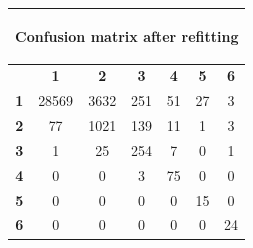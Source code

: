 \documentclass[c]{beamer}
\begin{document}
\begin{frame}
\begin{columns}
\begin{column}{0.6\textwidth}
  \begin{table}
  \begin{center}
  \begin{adjustbox}{max width=0.6\textwidth}
  {\tiny
  \begin{tabular}{|c|c|c|c|c|c|c|}
    \hline
    \multicolumn{7}{|c|}{{\tiny \begin{bf}Confusion matrix after refitting\end{bf}}} \\
    \hline
     & \textbf{1} & \textbf{2} & \textbf{3} & \textbf{4} & \textbf{5} & \textbf{6}\\
    \hline
    \textbf{1} & 28569 & 3632 & 251 & 51 & 27 & 3\\
    \hline
    \textbf{2} & 77 & 1021 & 139 & 11 & 1 & 3\\
    \hline
    \textbf{3} & 1 & 25 & 254 & 7 & 0 & 1\\
    \hline
    \textbf{4} & 0 & 0 & 3 & 75 & 0 & 0\\
    \hline
    \textbf{5} & 0 & 0 & 0 & 0 & 15 & 0\\
    \hline
    \textbf{6} & 0 & 0 & 0 & 0 & 0 & 24\\
    \hline
  \end{tabular}
  }
  \end{adjustbox}
  \end{center}
  \end{table}
\end{column}
\begin{column}{0.6\textwidth}

\end{column}
\end{columns}
\end{frame}
\end{document}

